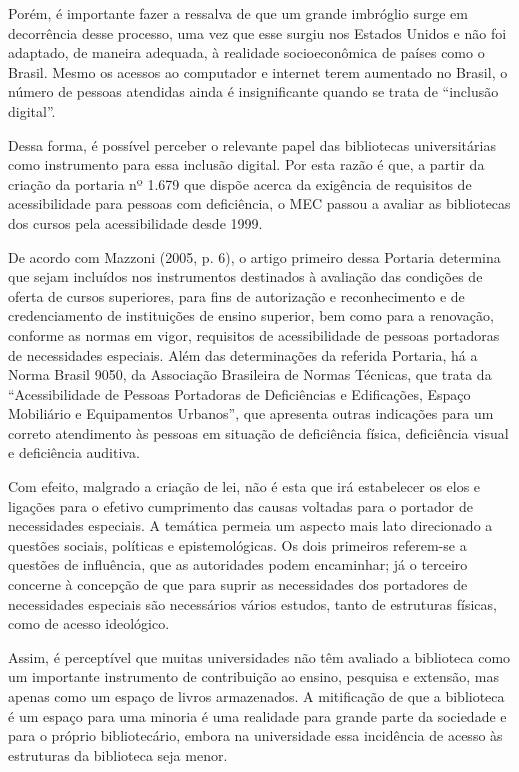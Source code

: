 	Porém, é importante fazer a ressalva de que um grande imbróglio surge em decorrência desse processo, uma vez que esse surgiu nos Estados Unidos e não foi adaptado, de maneira adequada, à realidade socioeconômica de países como o Brasil. Mesmo os acessos ao computador e internet terem aumentado no Brasil, o número de pessoas atendidas ainda é insignificante quando se trata de “inclusão digital”.

	Dessa forma, é possível perceber o relevante papel das bibliotecas universitárias como instrumento para essa inclusão digital. Por esta razão é que, a partir da criação da portaria nº 1.679 que dispõe acerca da exigência de requisitos de acessibilidade para pessoas com deficiência, o MEC passou a avaliar as bibliotecas dos cursos pela acessibilidade desde 1999.

	De acordo com Mazzoni (2005, p. 6), o artigo primeiro dessa Portaria determina que sejam incluídos nos instrumentos destinados à avaliação das condições de oferta de cursos superiores, para fins de autorização e reconhecimento e de credenciamento de instituições de ensino superior, bem como para a renovação, conforme as normas em vigor, requisitos de acessibilidade de pessoas portadoras de necessidades especiais. Além das determinações da referida Portaria, há a Norma Brasil 9050, da Associação Brasileira de Normas Técnicas, que trata da “Acessibilidade de Pessoas Portadoras de Deficiências e Edificações, Espaço Mobiliário e Equipamentos Urbanos”, que apresenta outras indicações para um correto atendimento às pessoas em situação de deficiência física, deficiência visual e deficiência auditiva.

	Com efeito, malgrado a criação de lei, não é esta que irá estabelecer os elos e ligações para o efetivo cumprimento das causas voltadas para o portador de necessidades especiais. A temática permeia um aspecto mais lato direcionado a questões sociais, políticas e epistemológicas. Os dois primeiros referem-se a questões de influência, que as autoridades podem encaminhar; já o terceiro concerne à concepção de que para suprir as necessidades dos portadores de necessidades especiais são necessários vários estudos, tanto de estruturas físicas, como de acesso ideológico.

	Assim, é perceptível que muitas universidades não têm avaliado a biblioteca como um importante instrumento de contribuição ao ensino, pesquisa e extensão, mas apenas como um espaço de livros armazenados. A mitificação de que a biblioteca é um espaço para uma minoria é uma realidade para grande parte da sociedade e para o próprio bibliotecário, embora na universidade essa incidência de acesso às estruturas da biblioteca seja menor.

